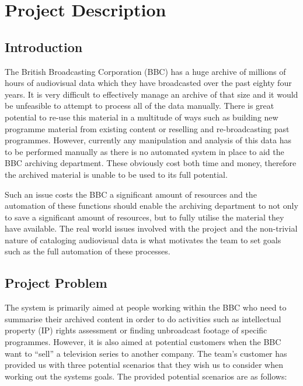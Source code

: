 \section{Project Description}

\subsection{Introduction}

The British Broadcasting Corporation (BBC) has a huge archive of millions of hours of audiovisual data which they have broadcasted over the past eighty four years. It is very difficult to effectively manage an archive of that size and it would be unfeasible to attempt to process all of the data manually. There is great potential to re-use this material in a multitude of ways such as building new programme material from existing content or reselling and re-broadcasting past programmes. However, currently any manipulation and analysis of this data has to be performed manually as there is no automated system in place to aid the BBC archiving department. These obviously cost both time and money, therefore the archived material is unable to be used to its full potential.

Such an issue costs the BBC a significant amount of resources and the automation of these functions should enable the archiving department to not only to save a significant amount of resources, but to fully utilise the material they have available. The real world issues involved with the project and the non-trivial nature of cataloging audiovisual data is what motivates the team to set goals such as the full automation of these processes.

\subsection{Project Problem}
\label{sec:ProjectProblem}
The system is primarily aimed at people working within the BBC who need to summarise their archived content in order to do activities 
such as intellectual property (IP) rights assessment or finding unbroadcast footage of specific programmes. However, it is also aimed at 
potential customers when the BBC want to “sell” a television series to another company. The team's customer has provided us with three 
potential scenarios that they wish us to consider when working out the systems goals. The provided potential scenarios are as follows:

